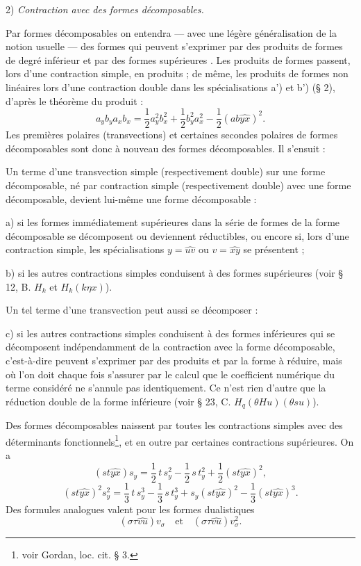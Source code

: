 \documentclass[11pt]{article}
\begin{document}
2) \emph{Contraction avec des formes décomposables.}

Par \og{} formes décomposables \fg{} on entendra --- avec une légère généralisation de la notion usuelle --- des formes qui peuvent s'exprimer par des produits de formes de degré inférieur et par des formes \og{} supérieures \fg{}. Les produits de formes passent, lors d'une contraction simple, en produits ; de même, les produits de formes non linéaires lors d'une contraction double dans les spécialisations a') et b') (\S{} 2), d'après le théorème du produit :
\[
a_yb_y a_xb_x=\frac12a_y^2b_x^2+\frac12b_y^2a_x^2-\frac12(ab\widehat{yx})^2.
\]
Les premières polaires (transvections) et certaines secondes polaires de formes décomposables sont donc à nouveau des formes décomposables. Il s'ensuit :

Un terme d'une transvection simple (respectivement double) sur une forme décomposable, né par contraction simple (respectivement double) avec une forme décomposable, devient lui-même une forme décomposable :

a) si les formes immédiatement supérieures dans la série de formes de la forme décomposable se décomposent ou deviennent réductibles, ou encore si, lors d'une contraction simple, les spécialisations $y=\widehat{uv}$ ou $v=\widehat{xy}$ se présentent ;

b) si les autres contractions simples conduisent à des formes supérieures (voir \S{} 12, B. $H_k$ et $H_k(k\eta x)$).

Un tel terme d'une transvection peut aussi se décomposer :

c) si les autres contractions simples conduisent à des formes inférieures qui se décomposent indépendamment de la contraction avec la forme décomposable, c'est-à-dire peuvent s'exprimer par des produits et par la forme à réduire, mais où l'on doit chaque fois s'assurer par le calcul que le coefficient numérique du terme considéré ne s'annule pas identiquement. Ce n'est rien d'autre que la \og{} réduction double \fg{} de la forme inférieure (voir \S{} 23, C. $H_q(\theta H u)(\theta s u)$).

Des formes décomposables naissent par toutes les contractions simples avec des déterminants fonctionnels\footnote{voir Gordan, loc. cit. \S{} 3.}, et en outre par certaines contractions supérieures. On a
\[
(st\widehat{yx})s_y=\frac12\,t\,s_y^2-\frac12\,s\,t_y^2+\frac12(st\widehat{yx})^2,
\]
\[
(st\widehat{yx})^2s_y^2=\frac13\,t\,s_y^3-\frac13\,s\,t_y^3+s_y(st\widehat{yx})^2-\frac13(st\widehat{yx})^3.
\]
Des formules analogues valent pour les formes dualistiques
\[
(\sigma\tau\widehat{vu})v_\sigma
\quad\text{et}\quad
(\sigma\tau\widehat{vu})v_\sigma^2.
\]
\end{document}
